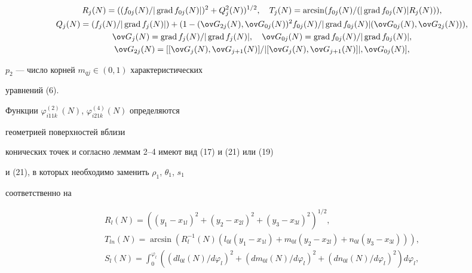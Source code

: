 \begin{pf}
\begin{gather}
% 


R_j(N)=((f_{0j}(N)/|\Grad f_{0j}(N)|)^2+Q^2_j(N))^{1/2},\quad 


T_j(N)=\arcsin(f_{0j}(N)/(|\Grad f_{0j}(N)|R_j(N))),\notag \\ 


% 


Q_j(N)=(f_j(N)/|\Grad f_j(N)|)+(1-(\ov G_{2j}(N),\ov G_{0j}(N))^2 


f_{0j}(N)/|\Grad f_{0j}(N)|(\ov G_{0j}(N),\ov G_{2j}(N))),\notag\\ 


% 


\ov G_j(N)=\Grad f_j(N)/|\Grad f_j(N)|,\quad 


\ov G_{0j}(N)=\Grad f_{0j}(N)/|\Grad f_{0j}(N)|,\notag \\ 


% 


\ov G_{2j}(N)=[[\ov G_j(N),\ov G_{j+1}(N)]/ 


|[\ov G_j(N),\ov G_{j+1}(N)]|,\ov G_{0j}(N)],\notag 


\end{gather} 


$p_2$ --- число корней $m_{qj}\in(0,1)$ характеристических  


уравнений (6). 


 


Функции $\varphi^{(2)}_{i11k}(N)$, $\varphi^{(4)}_{i21k}(N)$ определяются 


геометрией поверхностей вблизи  


конических точек и согласно леммам 2--4 имеют вид (17) и (21) или (19) 


и (21), в которых необходимо заменить $\rho_1$, $\theta_1$, $s_1$ 


соответственно на 


\begin{gather*} 


R_l(N)=((y_1-x_{1l})^2+(y_2-x_{2l})^2+(y_3-x_{3l})^2)^{1/2},\\ 


% 


T_{ln}(N)=\arcsin(R^{-1}_l(N)(l_{0l}(y_1-x_{1l})+m_{0l}(y_2-x_{2l})+ 


n_{0l}(y_3-x_{3l}))),\\ 


% 


S_l(N)=\int^{\varphi_l}_0((dl_{0l}(N)/d\varphi_l)^2+ 


(dm_{0l}(N)/d\varphi_l)^2+(dn_{0l}(N)/d\varphi_l)^2)d\varphi_l, 



\end{gather*}
\end{pf}
